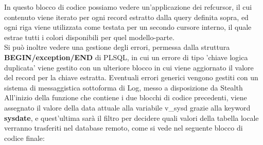 In questo blocco di codice possiamo vedere un'applicazione dei refcursor, il cui contenuto viene iterato per ogni record estratto dalla query definita sopra, ed ogni riga viene utilizzata come testata per un secondo cursore interno, il quale estrae tutti i colori disponibili per quel modello-parte.\\
Si può inoltre vedere una gestione degli errori, permessa dalla struttura \textbf{BEGIN/exception/END} di PLSQL, in cui un errore di tipo 'chiave logica duplicata' viene gestito con un ulteriore blocco in cui viene aggiornato il valore del record per la chiave estratta. Eventuali errori generici vengono gestiti con un sistema di messaggistica sottoforma di Log, messo a disposizione da Stealth
All'inizio della funzione che contiene i due blocchi di codice precedenti, viene assegnato il valore della data attuale alla variabile v\_sysd grazie alla keyword \textbf{sysdate}, e quest'ultima sarà il filtro per decidere quali valori della tabella locale verranno trasferiti nel database remoto, come si vede nel seguente blocco di codice finale:
